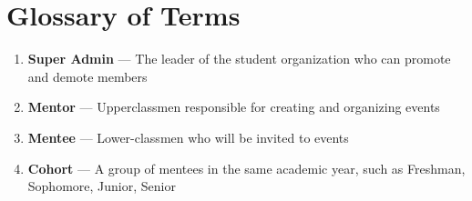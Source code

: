 \section{Glossary of Terms}

\begin{enumerate}
    \item \textbf{Super Admin} --- The leader of the student organization who
    can promote and demote members

    \item \textbf{Mentor} --- Upperclassmen responsible for creating and
    organizing events

    \item \textbf{Mentee} --- Lower-classmen who will be invited to events
    
    \item \textbf{Cohort} --- A group of mentees in the same academic year, such
    as Freshman, Sophomore, Junior, Senior
\end{enumerate}
